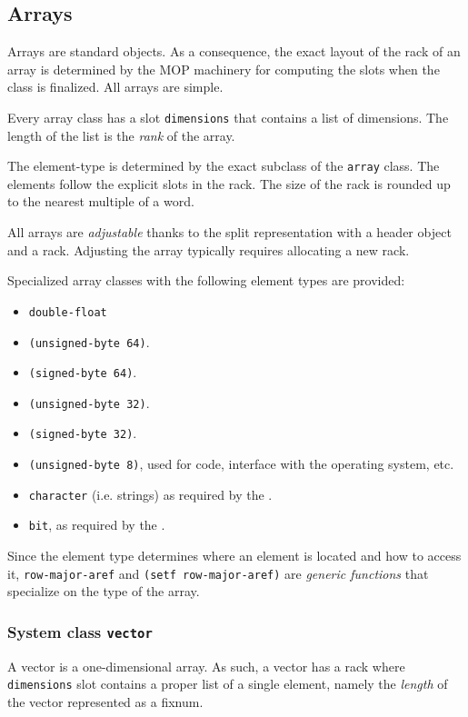 \subsection{Arrays}
\label{sec-data-representation-arrays}

Arrays are standard objects.  As a consequence, the exact layout of
the rack of an array is determined by the MOP machinery for computing
the slots when the class is finalized.  All arrays are simple.

Every array class has a slot \texttt{dimensions} that contains a list
of dimensions.  The length of the list is the \emph{rank} of the
array.

The element-type is determined by the exact subclass of the
\texttt{array} class.  The elements follow the explicit slots in the
rack.  The size of the rack is rounded up to the nearest multiple of a
word.

All arrays are \emph{adjustable} thanks to the split representation
with a header object and a rack.  Adjusting the array
typically requires allocating a new rack.

Specialized array classes with the following element types are
provided:

\begin{itemize}
\item \texttt{double-float}
\item \texttt{(unsigned-byte 64)}.
\item \texttt{(signed-byte 64)}.
\item \texttt{(unsigned-byte 32)}.
\item \texttt{(signed-byte 32)}.
\item \texttt{(unsigned-byte 8)}, used for code, interface with the
  operating system, etc.
\item \texttt{character} (i.e. strings) as required by the \hs{}.
\item \texttt{bit}, as required by the \hs{}.
\end{itemize}

Since the element type determines where an element is located and how
to access it, \texttt{row-major-aref} and \texttt{(setf
  row-major-aref)} are \emph{generic functions} that specialize on the
type of the array.

\subsubsection{System class \texttt{vector}}

A vector is a one-dimensional array.  As such, a vector has a rack
where \texttt{dimensions} slot contains a proper list of a single
element, namely the \emph{length} of the vector represented as a
fixnum.

